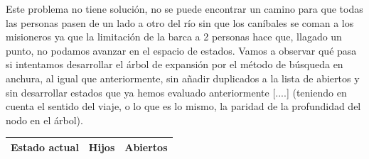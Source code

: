 \documentclass{article}
\begin{document}
Este problema no tiene solución, no se puede encontrar un camino para que todas las personas pasen de un lado a otro del río sin que los caníbales se coman a los misioneros ya que la limitación de la barca a 2 personas hace que, llagado un punto, no podamos avanzar en el espacio de estados. Vamos a observar qué pasa si intentamos desarrollar el árbol de expansión por el método de búsqueda en anchura, al igual que anteriormente, sin añadir duplicados a la lista de abiertos y sin desarrollar estados que ya hemos evaluado anteriormente [....] (teniendo en cuenta el sentido del viaje, o lo que es lo mismo, la paridad de la profundidad del nodo en el árbol). \\

\begin{center}
  \begin{longtable}{ |p{2cm}|p{2cm}|>{\raggedright\arraybackslash}p{7cm}|  }
    \hline
    Estado actual & Hijos & Abiertos \\ [0.5ex] 
    \hline\hline
    

\end{longtable}
\end{center}
\end{document}
